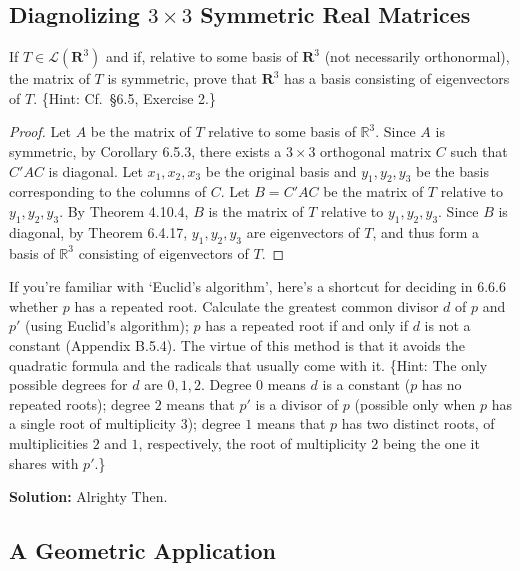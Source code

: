 \subsection{Diagnolizing $3 \times 3$ Symmetric Real Matrices}


\begin{tcolorbox}[title=Problem 2, breakable]
If $T \in \mathcal{L}(\mathbf{R}^3)$ and if, 
relative to some basis of $\mathbf{R}^3$ (not necessarily orthonormal), 
the matrix of $T$ is symmetric, prove that $\mathbf{R}^3$ has a basis consisting 
of eigenvectors of $T$. \{Hint: Cf.\ \S6.5, Exercise 2.\}
\end{tcolorbox}

\begin{proof}
    Let $A$ be the matrix of $T$ relative to some basis of $\mathbb{R}^3$. Since $A$ is symmetric,
    by Corollary 6.5.3, there exists a $3 \times 3$
    orthogonal matrix $C$ such that $C'AC$ is diagonal.
    Let $x_1, x_2, x_3$ be the original basis and $y_1, y_2, y_3$ be the basis corresponding to the columns of $C$.
    Let $B = C'AC$ be the matrix of $T$ relative to $y_1, y_2, y_3$.
    By Theorem 4.10.4, $B$ is the matrix of $T$ relative to $y_1, y_2, y_3$. Since $B$ is diagonal,
    by Theorem 6.4.17, $y_1, y_2, y_3$ are eigenvectors of $T$, and thus form a basis of $\mathbb{R}^3$ consisting of eigenvectors of $T$.
\end{proof}

\begin{tcolorbox}[title=Problem 3, breakable]
If you're familiar with `Euclid's algorithm', 
here's a shortcut for deciding in 6.6.6 whether $p$ has a repeated root. 
Calculate the greatest common divisor $d$ of $p$ and $p'$ (using Euclid's algorithm); 
$p$ has a repeated root if and only if $d$ is not a constant (Appendix B.5.4). 
The virtue of this method is that it avoids the quadratic formula 
and the radicals that usually come with it.
\{Hint: The only possible degrees for $d$ are $0, 1, 2$. 
Degree $0$ means $d$ is a constant ($p$ has no repeated roots); 
degree $2$ means that $p'$ is a divisor of $p$ 
(possible only when $p$ has a single root of multiplicity $3$); 
degree $1$ means that $p$ has two distinct roots, of multiplicities 
$2$ and $1$, respectively, the root of multiplicity $2$ being the one 
it shares with $p'$.\}
\end{tcolorbox}

\textbf{Solution: } Alrighty Then.

\subsection{A Geometric Application}


